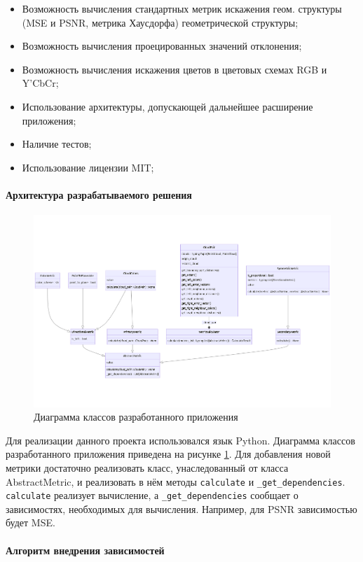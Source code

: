 \documentclass[a4paper,12pt]{extreport}
\begin{document}
\begin{itemize}
    \item Возможность вычисления стандартных метрик искажения геом. структуры (MSE и PSNR,
    метрика Хаусдорфа) геометрической структуры;
    \item Возможность вычисления проецированных значений отклонения;
    \item Возможность вычисления искажения цветов в цветовых схемах RGB и Y'CbCr;
    \item Использование архитектуры, допускающей дальнейшее расширение
    приложения;
    \item Наличие тестов;
    \item Использование лицензии MIT;
\end{itemize}

\paragraph{Архитектура разрабатываемого решения}

\begin{figure}[H]
    \centering
    \includegraphics[width=0.7\linewidth]{assets/classes.png}
    \caption{Диаграмма классов разработанного приложения}
    \label{img:metric_classes}
\end{figure}

Для реализации данного проекта использовался язык Python. Диаграмма классов
разработанного приложения приведена на рисунке \ref{img:metric_classes}. Для
добавления новой метрики достаточно реализовать класс, унаследованный от класса
AbstractMetric, и реализовать в нём методы \texttt{calculate} и
\texttt{\_get\_dependencies}. \texttt{calculate} реализует вычисление, а
\texttt{\_get\_dependencies} сообщает о зависимостях, необходимых для
вычисления. Например, для PSNR зависимостью будет MSE.

\paragraph{Алгоритм внедрения зависимостей}
\end{document}
